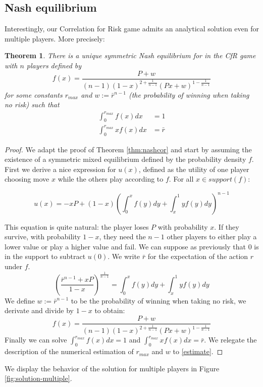 \documentclass[preprint,12pt,authoryear]{elsarticle}
\newtheorem{theorem}{Theorem}[section]
\theoremstyle{definition}
\begin{document}
\subsection{Nash equilibrium}
Interestingly, our Correlation for Risk game admits an analytical solution even for multiple players. More precisely:
\begin{theorem}\label{thm:multiple}
    There is a unique symmetric Nash equilibrium for in the CfR game with $n$ players defined by $$f(x) = \frac{P + w}{(n-1)(1-x)^{2+\frac{1}{n-1}} (P x + w)^{1 - \frac{1}{n-1}}}$$
    for some constants $r_{max}$ and $w := \bar r ^ {n-1}$ (the probability of winning when taking no risk) such that 
    \begin{align*}
        \int_0^{r_{max}} f(x) dx &= 1 \\
        \int_0^{r_{max}} x f(x) dx &= \bar r 
    \end{align*}
\end{theorem} 
\begin{proof}
    
We adapt the proof of Theorem \ref{thm:nashcor} and start by assuming the existence of a symmetric mixed equilibrium defined by the probability density $f$. First we derive a nice expression for $u(x)$, defined as the utility of one player choosing move $x$ while the others play according to $f$. For all $x \in support(f)$:

$$u(x) = -x P + (1-x) \left( \int_0^x f(y) dy +\int_x^1 y f(y) dy \right)^{n-1}$$

This equation is quite natural: the player loses $P$ with probability $x$. If they survive, with probability $1-x$, they need the $n-1$ other players to either play a lower value or play a higher value and fail. We can suppose as previously that $0$ is in the support to subtract $u(0)$. We write $\bar r$ for the expectation of the action $r$ under $f$.
$$\left(\frac{\bar r^{n-1} + x P}{1-x} \right)^\frac{1}{n-1} = \int_0^x f(y) dy + \int_x^1 y f(y) dy$$
We define $w := \bar r ^ {n-1}$ to be the probability of winning when taking no risk, we derivate and divide by $1-x$ to obtain:
$$f(x) = \frac{P + w}{(n-1)(1-x)^{2+\frac{1}{n-1}} (P x + w)^{1 - \frac{1}{n-1}}}$$
Finally we can solve $\int_0^{r_{max}} f(x) dx= 1$ and $\int_0^{r_{max}} x f(x) dx = \bar r$. We relegate the description of the numerical estimation of ${r_{max}}$ and $w$ to \ref{estimate}.
\end{proof}

We display the behavior of the solution for multiple players in Figure \ref{fig:solution-multiple}.
\end{document}
